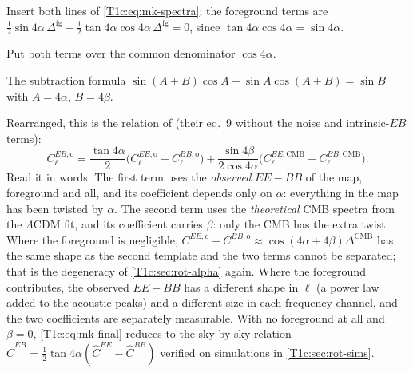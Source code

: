 \begin{explain}
  \item Insert both lines of \eqref{T1c:eq:mk-spectra}; the foreground terms are $\frac12\sin4\alpha\,\Delta^{\mathrm{fg}}-\frac12\tan4\alpha\cos4\alpha\,\Delta^{\mathrm{fg}}=0$, since $\tan4\alpha\cos4\alpha=\sin4\alpha$.
  \item Put both terms over the common denominator $\cos4\alpha$.
  \item The subtraction formula $\sin(A+B)\cos A-\sin A\cos(A+B)=\sin B$ with $A=4\alpha$, $B=4\beta$.
\end{explain}
Rearranged, this is the relation of \cite{Minami2019} (their eq.~9 without the noise and intrinsic-$EB$ terms):
\begin{equation}
C^{EB,\mathrm o}_\ell=\frac{\tan4\alpha}{2}\bigl(C^{EE,\mathrm o}_\ell-C^{BB,\mathrm o}_\ell\bigr)+\frac{\sin4\beta}{2\cos4\alpha}\bigl(C^{EE,\mathrm{CMB}}_\ell-C^{BB,\mathrm{CMB}}_\ell\bigr).
\label{T1c:eq:mk-final}
\end{equation}
Read it in words. The first term uses the \emph{observed} $EE-BB$ of the map, foreground and all, and its coefficient depends only on $\alpha$: everything in the map has been twisted by $\alpha$. The second term uses the \emph{theoretical} CMB spectra from the $\Lambda$CDM fit, and its coefficient carries $\beta$: only the CMB has the extra twist. Where the foreground is negligible, $C^{EE,\mathrm o}-C^{BB,\mathrm o}\approx\cos(4\alpha+4\beta)\Delta^{\mathrm{CMB}}$ has the same shape as the second template and the two terms cannot be separated; that is the degeneracy of \cref{T1c:sec:rot-alpha} again. Where the foreground contributes, the observed $EE-BB$ has a different shape in $\ell$ (a power law added to the acoustic peaks) and a different size in each frequency channel, and the two coefficients are separately measurable. With no foreground at all and $\beta=0$, \eqref{T1c:eq:mk-final} reduces to the sky-by-sky relation $\widehat C^{EB}=\frac12\tan4\alpha(\widehat C^{EE}-\widehat C^{BB})$ verified on simulations in \cref{T1c:sec:rot-sims}.

